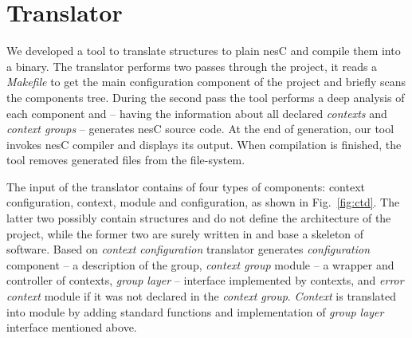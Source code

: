 \section{Translator}

We developed a tool to translate \conesc structures to plain nesC and compile
them into a binary. The translator performs two passes through the project, it
reads a \emph{Makefile} to get the main configuration component of the project
and briefly scans the components tree. During the second pass the tool performs
a deep analysis of each component and -- having the information about all
declared \emph{contexts} and \emph{context groups} -- generates nesC source
code. At the end of generation, our tool invokes nesC compiler and displays its
output. When compilation is finished, the tool removes generated files from the
file-system.


The input of the translator contains of four types of components: context
configuration, context, module and configuration, as shown in
Fig.~\ref{fig:ctd}. The latter two possibly contain \conesc structures and do
not define the architecture of the project, while the former two are surely
written in \conesc and base a skeleton of software. Based on \emph{context
configuration} translator generates \emph{configuration} component -- a
description of the group, \emph{context group} module -- a wrapper and
controller of contexts, \emph{group layer} -- interface implemented by contexts,
and \emph{error context} module if it was not declared in the \emph{context
group}. \emph{Context} is translated into module by adding standard functions
and implementation of \emph{group layer} interface mentioned above.

